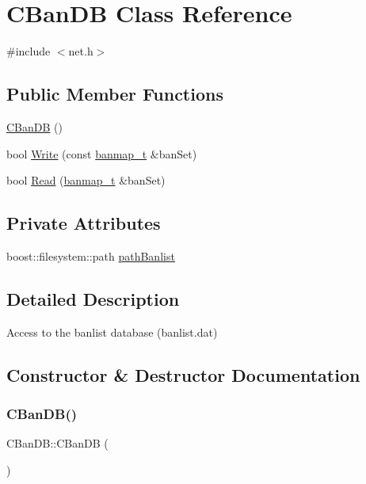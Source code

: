 \hypertarget{class_c_ban_d_b}{}\section{C\+Ban\+DB Class Reference}
\label{class_c_ban_d_b}


{\ttfamily \#include $<$net.\+h$>$}

\subsection*{Public Member Functions}
\begin{DoxyCompactItemize}
\item 
\mbox{\hyperlink{class_c_ban_d_b_aaa72a14ee1c95a75cd5be52ffac0386b}{C\+Ban\+DB}} ()
\item 
bool \mbox{\hyperlink{class_c_ban_d_b_a0550a06c6b5987869f557467fe7f9896}{Write}} (const \mbox{\hyperlink{net_8h_af9675d81650e48d20ae495adf73da102}{banmap\+\_\+t}} \&ban\+Set)
\item 
bool \mbox{\hyperlink{class_c_ban_d_b_aa3bb0e398409c933bf79a9af56c807f2}{Read}} (\mbox{\hyperlink{net_8h_af9675d81650e48d20ae495adf73da102}{banmap\+\_\+t}} \&ban\+Set)
\end{DoxyCompactItemize}
\subsection*{Private Attributes}
\begin{DoxyCompactItemize}
\item 
boost\+::filesystem\+::path \mbox{\hyperlink{class_c_ban_d_b_a0e1a5a91308ec65cbbff8e3f5dd98431}{path\+Banlist}}
\end{DoxyCompactItemize}


\subsection{Detailed Description}
Access to the banlist database (banlist.\+dat) 

\subsection{Constructor \& Destructor Documentation}
\mbox{\label{class_c_ban_d_b_aaa72a14ee1c95a75cd5be52ffac0386b}} 
\subsubsection{\texorpdfstring{C\+Ban\+D\+B()}{CBanDB()}}
{\footnotesize\ttfamily C\+Ban\+D\+B\+::\+C\+Ban\+DB (\begin{DoxyParamCaption}{ }\end{DoxyParamCaption})}



